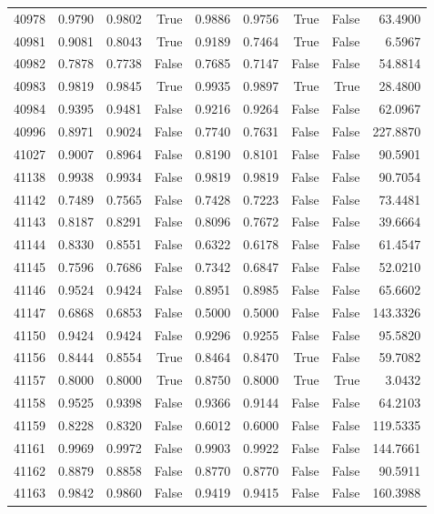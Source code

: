 \begin{longtable}{rrrrrrrrr}
40978 & 0.9790 & 0.9802 & True & 0.9886 & 0.9756 & True & False & 63.4900 \\
40981 & 0.9081 & 0.8043 & True & 0.9189 & 0.7464 & True & False & 6.5967 \\
40982 & 0.7878 & 0.7738 & False & 0.7685 & 0.7147 & False & False & 54.8814 \\
40983 & 0.9819 & 0.9845 & True & 0.9935 & 0.9897 & True & True & 28.4800 \\
40984 & 0.9395 & 0.9481 & False & 0.9216 & 0.9264 & False & False & 62.0967 \\
40996 & 0.8971 & 0.9024 & False & 0.7740 & 0.7631 & False & False & 227.8870 \\
41027 & 0.9007 & 0.8964 & False & 0.8190 & 0.8101 & False & False & 90.5901 \\
41138 & 0.9938 & 0.9934 & False & 0.9819 & 0.9819 & False & False & 90.7054 \\
41142 & 0.7489 & 0.7565 & False & 0.7428 & 0.7223 & False & False & 73.4481 \\
41143 & 0.8187 & 0.8291 & False & 0.8096 & 0.7672 & False & False & 39.6664 \\
41144 & 0.8330 & 0.8551 & False & 0.6322 & 0.6178 & False & False & 61.4547 \\
41145 & 0.7596 & 0.7686 & False & 0.7342 & 0.6847 & False & False & 52.0210 \\
41146 & 0.9524 & 0.9424 & False & 0.8951 & 0.8985 & False & False & 65.6602 \\
41147 & 0.6868 & 0.6853 & False & 0.5000 & 0.5000 & False & False & 143.3326 \\
41150 & 0.9424 & 0.9424 & False & 0.9296 & 0.9255 & False & False & 95.5820 \\
41156 & 0.8444 & 0.8554 & True & 0.8464 & 0.8470 & True & False & 59.7082 \\
41157 & 0.8000 & 0.8000 & True & 0.8750 & 0.8000 & True & True & 3.0432 \\
41158 & 0.9525 & 0.9398 & False & 0.9366 & 0.9144 & False & False & 64.2103 \\
41159 & 0.8228 & 0.8320 & False & 0.6012 & 0.6000 & False & False & 119.5335 \\
41161 & 0.9969 & 0.9972 & False & 0.9903 & 0.9922 & False & False & 144.7661 \\
41162 & 0.8879 & 0.8858 & False & 0.8770 & 0.8770 & False & False & 90.5911 \\
41163 & 0.9842 & 0.9860 & False & 0.9419 & 0.9415 & False & False & 160.3988 \\

\end{longtable}
